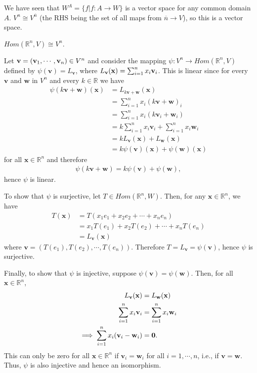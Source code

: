 \documentclass[12pt,letterpaper,reqno]{article}
\numberwithin{equation}{section}
\newcommand{\bv}{\mathbf{v}}
\newcommand{\bw}{\mathbf{w}}
\newcommand{\bx}{\mathbf{x}}
\begin{document}
\begin{pf}
	We have seen that $W^A=\{f|f:A \to W\}$ is a vector space for any common domain $A$. $V^n \cong V^{\overline{n}}$ (the RHS being the set of all maps from $\overline{n} \to V$), so this is a vector space.
\end{pf}

\begin{prop}
	$Hom(\mathbb{R}^n,V) \cong V^n$.
\end{prop}

\begin{pf}
	Let ${\bf v}=(\bv_1,\cdots,\bv_n) \in V^n$  and consider the mapping $\psi:V^n \to Hom(\mathbb{R}^n,V)$ defined by $\psi(\bv)=L_{\bv}$, where $L_{\bv}({\bf x})=\sum_{i=1}^nx_i\bv_i$. This is linear since for every $\bv$ and $\bw$ in $V^n$ and every $k \in \mathbb{R}$ we have 
	\begin{align*}
		\psi(k\bv+\bw)(\bx)&=L_{k\bv+\bw}(\bx) \\
		&=\sum_{i=1}^nx_i(k\bv+\bw)_i \\
		&=\sum_{i=1}^nx_i(k\bv_i+\bw_i) \\
		&=k\sum_{i=1}^nx_i\bv_i+\sum_{i=1}^nx_i\bw_i \\
		&=kL_{\bv}(\bx)+L_{\bw}(\bx) \\
		&=k\psi(\bv)(\bx)+\psi(\bw)(\bx)
	\end{align*}
for all $\bx \in \mathbb{R}^n$ and therefore
\begin{align*}
	\psi(k\bv+\bw)=k\psi(\bv)+\psi(\bw),
\end{align*}
hence $\psi$ is linear. 

To show that $\psi$ is surjective, let $T \in Hom(\mathbb{R}^n,W)$. Then, for any $\bx \in \mathbb{R}^n$, we have 
\begin{align*}
	T(\bx)&=T(x_1e_1+x_2e_2+\cdots+x_ne_n) \\
	&=x_1T(e_1)+x_2T(e_2)+\cdots+x_nT(e_n) \\
	&=L_{\bv}(\bx) 
\end{align*} 
where $\bv=(T(e_1), T(e_2), \cdots, T(e_n))$. Therefore $T=L_{\bv}=\psi(\bv)$, hence $\psi$ is surjective.

Finally, to show that $\psi$ is injective, suppose $\psi(\bv)=\psi(\bw)$. Then, for all $\bx \in \mathbb{R}^n$,
\begin{align*}
	L_{\bv}(\bx)&=L_{\bw}(\bx) \\
	\sum_{i=1}^nx_i \bv_i &= \sum_{i=1}^nx_i\bw_i \\
	\implies \sum_{i=1}^nx_i(\bv_i-\bw_i)&={\bf 0}.  \\
\end{align*}
This can only be zero for all $\bx \in \mathbb{R}^n$ if $\bv_i=\bw_i$ for all $i=1,\cdots,n$, i.e., if $\bv=\bw$. Thus, $\psi$ is also injective and hence an isomorphism.
\end{pf}
\end{document}
